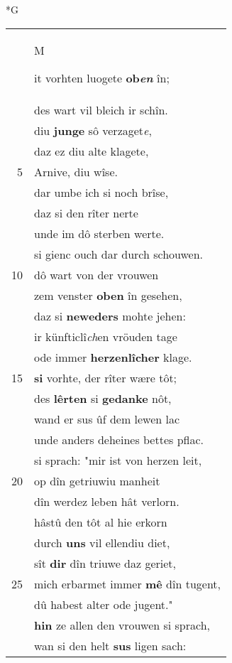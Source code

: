 \documentclass[8pt,a4paper,notitlepage]{article}
\begin{document}
\newpage
\begin{table}[ht]
\begin{minipage}[t]{0.5\linewidth}
\small
\begin{center}*G
\end{center}
\begin{tabular}{rl}
 & \begin{large}M\end{large}it vorhten luogete \textbf{ob\textit{en}} în;\\ 
 & des wart vil bleich ir schîn.\\ 
 & diu \textbf{junge} sô verzaget\textit{e},\\ 
 & daz ez diu alte klagete,\\ 
5 & Arnive, diu wîse.\\ 
 & dar umbe ich si noch brîse,\\ 
 & daz si den rîter nerte\\ 
 & unde im dô sterben werte.\\ 
 & si gienc ouch dar durch schouwen.\\ 
10 & dô wart von der vrouwen\\ 
 & zem venster \textbf{oben} în gesehen,\\ 
 & daz si \textbf{neweders} mohte jehen:\\ 
 & ir künfticlî\textit{ch}en vröuden tage\\ 
 & ode immer \textbf{herzenlîcher} klage.\\ 
15 & \textbf{si} vorhte, der rîter wære tôt;\\ 
 & des \textbf{lêrten} si \textbf{gedanke} nôt,\\ 
 & wand er sus ûf dem lewen lac\\ 
 & unde anders deheines bettes pflac.\\ 
 & si sprach: "mir ist von herzen leit,\\ 
20 & op dîn getriuwiu manheit\\ 
 & dîn werdez leben hât verlorn.\\ 
 & hâstû den tôt al hie erkorn\\ 
 & durch \textbf{uns} vil ellendiu diet,\\ 
 & sît \textbf{dir} dîn triuwe daz geriet,\\ 
25 & mich erbarmet immer \textbf{mê} dîn tugent,\\ 
 & dû habest alter ode jugent."\\ 
 & \textbf{hin} ze allen den vrouwen si sprach,\\ 
 & wan si den helt \textbf{sus} ligen sach:\\ 

\end{tabular}
\end{minipage}
\end{table}
\end{document}
